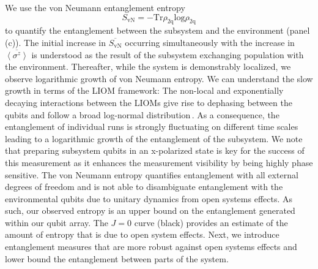We use the von Neumann entanglement entropy
\begin{equation}
S_{\text{vN}}=-\text{Tr} \rho_{\text{2q}} \text{log} \rho_{\text{2q}}
\end{equation}
\noindent to quantify the entanglement between the subsystem and the environment (panel\,(c)).
The initial increase in $\overline{ S_{\text{vN}} }$ occurring simultaneously with the increase in $\overline{ \left< \sigma^z \right> }$ is understood as the result of the subsystem exchanging population with the environment.  Thereafter, while the system is demonstrably localized, we observe logarithmic growth of von Neumann entropy. We can understand the slow growth in terms of the LIOM framework: The non-local and exponentially decaying interactions between the LIOMs give rise to dephasing between the qubits and follow a broad log-normal distribution\,\cite{Varma2019}. As a consequence, the entanglement of individual runs is strongly fluctuating on different time scales leading to a logarithmic growth of the entanglement of the subsystem. We note that preparing subsystem qubits in an x-polarized state is key for the success of this measurement as it enhances the measurement visibility by being highly phase sensitive. The von Neumann entropy quantifies entanglement with all external degrees of freedom and is not able to disambiguate entanglement with the environmental qubits due to unitary dynamics from open systems effects.  As such, our observed entropy is an upper bound on the entanglement generated within our qubit array.  The $J=0$ curve (black) provides an estimate of the amount of entropy that is due to open system effects.  Next, we introduce entanglement measures that are more robust against open systems effects and lower bound the entanglement between parts of the system.

